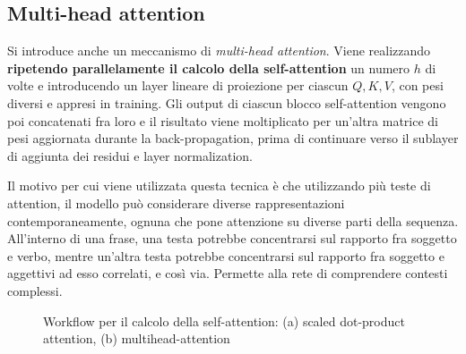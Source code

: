 \subsection{Multi-head attention}
Si introduce anche un meccanismo di \textit{multi-head attention}. Viene realizzando \textbf{ripetendo parallelamente il calcolo della self-attention} un numero \(h\) di volte e introducendo un layer lineare di proiezione per ciascun \(Q, K, V\), con pesi diversi e appresi in training. Gli output di ciascun blocco self-attention vengono poi concatenati fra loro e il risultato viene moltiplicato per un'altra matrice di pesi aggiornata durante la back-propagation, prima di continuare verso il sublayer di aggiunta dei residui e layer normalization.

Il motivo per cui viene utilizzata questa tecnica è che utilizzando più teste di attention, il modello può considerare diverse rappresentazioni contemporaneamente, ognuna che pone attenzione su diverse parti della sequenza. All'interno di una frase, una testa potrebbe concentrarsi sul rapporto fra soggetto e verbo, mentre un'altra testa potrebbe concentrarsi sul rapporto fra soggetto e aggettivi ad esso correlati, e così via. Permette alla rete di comprendere contesti complessi.

\begin{figure}[t]
    \centering
    \hspace{5mm}
    \caption{Workflow per il calcolo della self-attention: (a) scaled dot-product attention, (b) multihead-attention}
    \label{fig:attention}
\end{figure}

